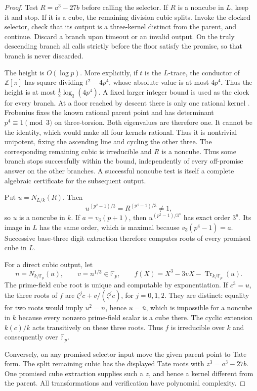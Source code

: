 \documentclass[11pt]{article}
\theoremstyle{definition}
\theoremstyle{remark}
\begin{document}
\begin{proof}
Test $R=a^3-27b$ before calling the selector.  If $R$ is a
noncube in $L$, keep it and stop.  If it is a cube, the
remaining division cubic splits.  Invoke the clocked selector,
check that its output is a three-kernel distinct from the
parent, and continue.  Discard a branch upon timeout or an
invalid output.  On the truly descending branch all calls
strictly before the floor satisfy the promise, so that branch
is never discarded.

The height is $O(\log p)$.  More explicitly, if $t$ is the
$L$-trace, the conductor of $\mathbb Z[\pi]$ has square
dividing $t^2-4p^4$, whose absolute value is at most $4p^4$.
Thus the height is at most
$\tfrac12\log_3(4p^4)$.  A fixed larger integer bound is
used as the clock for every branch.  At a floor reached by
descent there is only one rational kernel
\cite[Proposition~10, p.~518]{Sutherland2013Volcanoes}.
Frobenius fixes the known rational parent point and has
determinant $p^4\equiv1\pmod3$ on three-torsion.  Both
eigenvalues are therefore one.  It cannot be the identity,
which would make all four kernels rational.  Thus it is
nontrivial unipotent, fixing the ascending line and cycling
the other three.
The corresponding remaining cubic is irreducible and $R$
is a noncube.  Thus some branch stops successfully within
the bound, independently of every off-promise answer on the
other branches.  A successful noncube test is itself a
complete algebraic certificate for the subsequent output.

Put $u=N_{L/k}(R)$.  Then
\[
 u^{(p^2-1)/3}=R^{(p^4-1)/3}\ne1,
\]
so $u$ is a noncube in $k$.  If $a=v_3(p+1)$, then
$u^{(p^2-1)/3^a}$ has exact order $3^a$.  Its image in
$L$ has the same order, which is maximal because
$v_3(p^4-1)=a$.  Successive base-three digit extraction
therefore computes roots of every promised cube in $L$.

For a direct cubic output, let
\[
 n=N_{k/\mathbb F_p}(u),\qquad
 v=n^{1/3}\in\mathbb F_p,\qquad
 f(X)=X^3-3vX-\operatorname{Tr}_{k/\mathbb F_p}(u).
\]
The prime-field cube root is unique and computable by
exponentiation.  If $c^3=u$, the three roots of $f$ are
$\zeta^j c+v/(\zeta^j c)$, for $j=0,1,2$.
They are distinct: equality for two roots would imply
$u^2=n$, hence $u=\overline u$, which is impossible for
a noncube in $k$ because every nonzero prime-field scalar
is a cube there.  The cyclic extension $k(c)/k$ acts
transitively on these three roots.  Thus $f$ is irreducible
over $k$ and consequently over $\mathbb F_p$.

Conversely, on any promised selector input move the given
parent point to Tate form.  The split remaining cubic has
the displayed Tate roots with $z^3=a^3-27b$.  One promised
cube extraction supplies such a $z$, and hence a kernel
different from the parent.  All transformations and
verification have polynomial complexity.
\end{proof}
\end{document}

